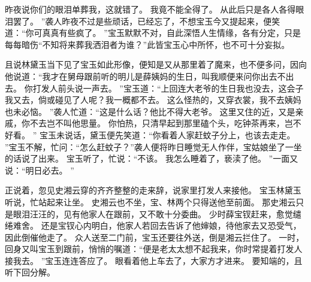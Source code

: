 昨夜说你们的眼泪单葬我，这就错了。
我竟不能全得了。
从此后只是各人各得眼泪罢了。
”袭人昨夜不过是些顽话，已经忘了，不想宝玉今又提起来，便笑道：“你可真真有些疯了。
”宝玉默默不对，自此深悟人生情缘，各有分定，只是每每暗伤“不知将来葬我洒泪者为谁？”此皆宝玉心中所怀，也不可十分妄拟。
\par
且说林黛玉当下见了宝玉如此形像，便知是又从那里着了魔来，也不便多问，因向他说道：“我才在舅母跟前听的明儿是薛姨妈的生日，叫我顺便来问你出去不出去。
你打发人前头说一声去。
”宝玉道：“上回连大老爷的生日我也没去，这会子我又去，倘或碰见了人呢？我一概都不去。
这么怪热的，又穿衣裳，我不去姨妈也未必恼。
”袭人忙道：“这是什么话？他比不得大老爷。
这里又住的近，又是亲戚，你不去岂不叫他思量。
你怕热，只清早起到那里磕个头，吃钟茶再来，岂不好看。
”
宝玉未说话，黛玉便先笑道：“你看着人家赶蚊子分上，也该去走走。
”宝玉不解，忙问：“怎么赶蚊子？”袭人便将昨日睡觉无人作伴，宝姑娘坐了一坐的话说了出来。
宝玉听了，忙说：“不该。
我怎么睡着了，亵渎了他。
”一面又说：“明日必去。
”\par
正说着，忽见史湘云穿的齐齐整整的走来辞，说家里打发人来接他。
宝玉林黛玉听说，忙站起来让坐。
史湘云也不坐，宝、林两个只得送他至前面。
那史湘云只是眼泪汪汪的，见有他家人在跟前，又不敢十分委曲。
少时薛宝钗赶来，愈觉缱绻难舍。
还是宝钗心内明白，他家人若回去告诉了他婶娘，待他家去又恐受气，因此倒催他走了。
众人送至二门前，宝玉还要往外送，倒是湘云拦住了。
一时，回身又叫宝玉到跟前，悄悄的嘱道：“便是老太太想不起我来，你时常提着打发人接我去。
”宝玉连连答应了。
眼看着他上车去了，大家方才进来。
要知端的，且听下回分解。
\par
{}
